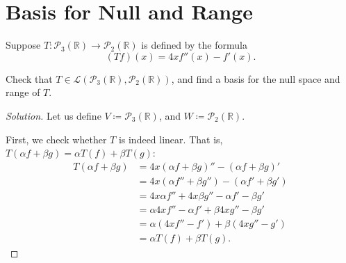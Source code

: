 \documentclass{article}
\newenvironment{solution}{\begin{proof}[Solution]}{\end{proof}}
\newcommand{\RR}{\mathbb{R}}
\begin{document}
	\newpage
	
	\section{Basis for Null and Range}
	\begin{hw}
		Suppose $T : \mathscr{P}_{3}(\RR) \rightarrow \mathscr{P}_{2}(\RR)$ is defined by the formula
		\begin{equation*}
			(Tf)(x) = 4xf''(x) - f'(x).
		\end{equation*}
	
		Check that $T \in \mathcal L(\mathscr{P}_{3}(\RR), \mathscr{P}_{2}(\RR))$, and find a basis for the null space and range of $T$.
	\end{hw}
	\begin{solution}
		Let us define $V \coloneq \mathscr{P}_{3}(\RR)$, and $W \coloneq \mathscr{P}_{2}(\RR)$.
		
		\begin{comment}
			Now, let us define the following maps $T_{1}, T_{2}, T_{3} \in\mathcal L(V, W)$ to be:
		\begin{enumerate}
			\item $T_{1}$ is the multiplication by $4x$ map.
			\item $T_{2}$ is the double differentiation map.
			\item $T_{3}$ is the differentiation map.
		\end{enumerate}
	
		We observe then that $T$ can be defined by a combination of these maps as follows:
		\begin{equation*}
			(Tf)(x) = ( (T_{1} T_{2})f)(x) - (T_{3}f)(x).
		\end{equation*} 
	
		We know then that it must be that 
		\end{comment}
		
		First, we check whether $T$ is indeed linear. That is, $T(\alpha f + \beta g) = \alpha T (f) + \beta T(g)$:
		\begin{align*}
			T(\alpha f + \beta g) &= 4x(\alpha f + \beta g)'' - (\alpha f + \beta g)' \\
			&= 4x(\alpha f'' + \beta g'') - (\alpha f' + \beta g') \\
			&= 4x\alpha f'' + 4x \beta g'' - \alpha f' - \beta g' \\
			&= \alpha 4xf'' - \alpha f' + \beta 4x g'' - \beta g' \\
			&= \alpha (4xf'' - f') + \beta (4x g'' - g') \\
			&= \alpha T(f) + \beta T(g).
		\end{align*}
	

\end{solution}
\end{document}
